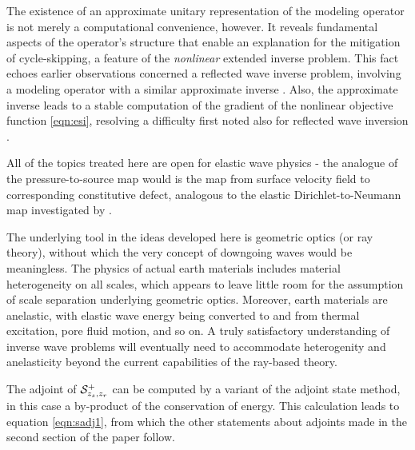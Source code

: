 \documentclass[georeport,12pt]{geophysics}
\begin{document}
The existence of an approximate unitary representation of the modeling
operator is not merely a computational convenience, however. It
reveals fundamental aspects of the operator's structure that enable
an explanation for the mitigation of cycle-skipping, a feature of the
{\em nonlinear} extended inverse problem. This fact echoes earlier observations
concerned a reflected wave inverse problem, involving a modeling
operator with a similar approximate inverse
\cite[]{tenKroode:IPTA14,Symes:IPTA14}. Also, the approximate inverse
leads to a stable computation of the gradient of the nonlinear
objective function \ref{eqn:esi}, resolving a difficulty first noted
also for reflected wave inversion \cite[]{KerSy:94}.

All of the topics
treated here are open for elastic wave physics - the analogue of the
pressure-to-source map would is the map from surface velocity field to
corresponding constitutive defect, analogous to the elastic
Dirichlet-to-Neumann map investigated by \cite{Rachele:00}.

The underlying tool in the ideas developed here is geometric optics
(or ray theory), without which the very concept of downgoing waves
would be meaningless. The physics of actual earth materials includes
material heterogeneity on all scales, which appears to leave little
room for the assumption of scale separation underlying geometric
optics. Moreover, earth materials are anelastic, with elastic wave
energy being converted to and from thermal excitation, pore fluid
motion, and so on. A truly satisfactory understanding of inverse wave
problems will eventually need to accommodate heterogenity and
anelasticity beyond the current capabilities of the ray-based theory.


The adjoint of ${\cal S}^+_{z_s,z_r}$ can be computed by a variant of
the adjoint state method, in this case a by-product of the
conservation of energy. This calculation leads to equation
\ref{eqn:sadj1}, from which the other statements about adjoints made in the second
section of the paper follow.
\end{document}
